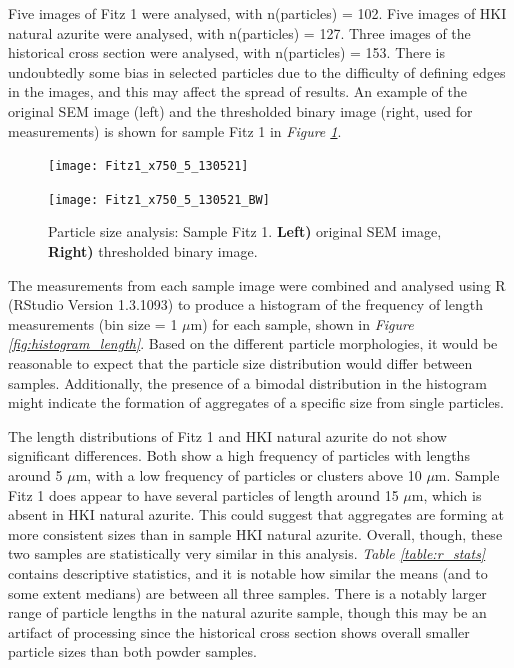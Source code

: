 Five images of Fitz 1 were analysed, with n(particles) = 102. Five images of HKI natural azurite were analysed, with n(particles) = 127. Three images of the historical cross section were analysed, with n(particles) = 153. There is undoubtedly some bias in selected particles due to the difficulty of defining edges in the images, and this may affect the spread of results. An example of the original SEM image (left) and the thresholded binary image (right, used for measurements) is shown for sample Fitz 1 in \textit{Figure \ref{fig:imageJ_fitz1}}.

\begin{figure}[H]
\centering
\begin{minipage}{.45\textwidth}
  \centering
  \texttt{[image: Fitz1\_x750\_5\_130521]}
\end{minipage}
\begin{minipage}{.45\textwidth}
  \centering
  \texttt{[image: Fitz1\_x750\_5\_130521\_BW]}
\end{minipage}
\caption[Particle size analysis: Sample Fitz 1]{Particle size analysis: Sample Fitz 1. \textbf{Left)} original SEM image, \textbf{Right)} thresholded binary image.}
\label{fig:imageJ_fitz1}
\end{figure}

The measurements from each sample image were combined and analysed using R (RStudio Version 1.3.1093) to produce a histogram of the frequency of length measurements (bin size = 1 $\mu$m) for each sample, shown in \textit{Figure \ref{fig:histogram_length}}. Based on the different particle morphologies, it would be reasonable to expect that the particle size distribution would differ between samples. Additionally, the presence of a bimodal distribution in the histogram might indicate the formation of aggregates of a specific size from single particles. 

The length distributions of Fitz 1 and HKI natural azurite do not show significant differences. Both show a high frequency of particles with lengths around 5 $\mu$m, with a low frequency of particles or clusters above 10 $\mu$m. Sample Fitz 1 does appear to have several particles of length around 15 $\mu$m, which is absent in HKI natural azurite. This could suggest that aggregates are forming at more consistent sizes than in sample HKI natural azurite. Overall, though, these two samples are statistically very similar in this analysis. \textit{Table \ref{table:r_stats}} contains descriptive statistics, and it is notable how similar the means (and to some extent medians) are between all three samples. There is a notably larger range of particle lengths in the natural azurite sample, though this may be an artifact of processing since the historical cross section shows overall smaller particle sizes than both powder samples. 

